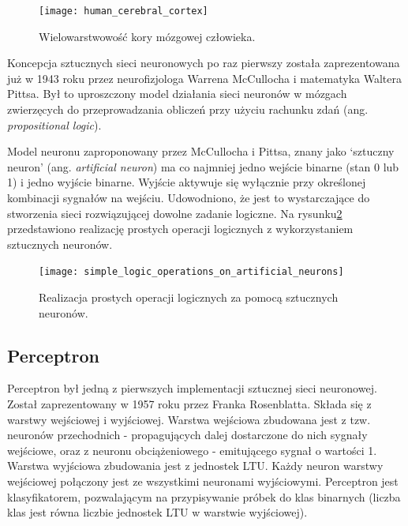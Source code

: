 \documentclass[a4paper,11pt]{article}
\begin{document}
    \bigskip

    \begin{figure}[H]
        \label{fig:human_cerebral_cortex}
        \centering
        \texttt{[image: human\_cerebral\_cortex]}
        \caption{Wielowarstwowość kory mózgowej człowieka\cite{UczenieMaszynowe2018}.}
    \end{figure}

    \bigskip

    Koncepcja sztucznych sieci neuronowych po raz pierwszy została zaprezentowana już w 1943 roku przez neurofizjologa Warrena McCullocha i matematyka Waltera Pittsa\cite{BeginningsOfANN1943}. Był to uproszczony model działania sieci neuronów w mózgach zwierzęcych do przeprowadzania obliczeń przy użyciu rachunku zdań (ang. \textit{propositional logic})\cite{UczenieMaszynowe2018}.

    \bigskip

    Model neuronu zaproponowany przez McCullocha i Pittsa, znany jako `sztuczny neuron' (ang. \textit{artificial neuron}) ma co najmniej jedno wejście binarne (stan 0 lub 1) i jedno wyjście binarne. Wyjście aktywuje się wyłącznie przy określonej kombinacji sygnałów na wejściu. Udowodniono, że jest to wystarczające do stworzenia sieci rozwiązującej dowolne zadanie logiczne\cite{UczenieMaszynowe2018}. Na rysunku\ref{fig:simple_logic_operations_on_artificial_neurons} przedstawiono realizację prostych operacji logicznych z wykorzystaniem sztucznych neuronów.

    \bigskip

    \begin{figure}[H]
        \label{fig:simple_logic_operations_on_artificial_neurons}
        \centering
        \texttt{[image: simple\_logic\_operations\_on\_artificial\_neurons]}
        \caption{Realizacja prostych operacji logicznych za pomocą sztucznych neuronów\cite{UczenieMaszynowe2018}.}
    \end{figure}

    \subsection{Perceptron}

    Perceptron był jedną z pierwszych implementacji sztucznej sieci neuronowej. Został zaprezentowany w 1957 roku przez Franka Rosenblatta. Składa się z warstwy wejściowej i wyjściowej. Warstwa wejściowa zbudowana jest z tzw. neuronów przechodnich - propagujących dalej dostarczone do nich sygnały wejściowe, oraz z neuronu obciążeniowego - emitującego sygnał o wartości 1. Warstwa wyjściowa zbudowania jest z jednostek LTU. Każdy neuron warstwy wejściowej połączony jest ze wszystkimi neuronami wyjściowymi. Perceptron jest klasyfikatorem, pozwalającym na przypisywanie próbek do klas binarnych (liczba klas jest równa liczbie jednostek LTU w warstwie wyjściowej)\cite{UczenieMaszynowe2018}.
\end{document}
